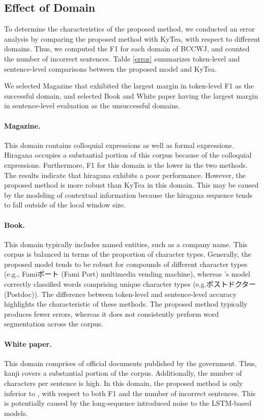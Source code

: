 \documentclass[11pt]{article}
\begin{document}
\subsection{Effect of Domain}
To determine the characteristics of the proposed method, we conducted
an error analysis by comparing the proposed method with KyTea, with respect to
different domains. Thus, we computed the F1 for each domain of BCCWJ, and
counted the number of incorrect sentences. Table \ref{error} summarizes
token-level and sentence-level comparisons between the proposed model and KyTea.

We selected Magazine that exhibited the largest margin in token-level F1 as
the successful domain, and selected Book and White paper having the largest
margin in sentence-level evaluation as the unsuccessful domains.

\paragraph{Magazine.} This domain contains colloquial expressions as well as
formal expressions. Hiragana occupies a substantial portion of this corpus
because of the colloquial expressions. Furthermore, F1 for this domain is the
lower in the two methods.
The results indicate that hiragana exhibits a poor performance. However, the
proposed method is more robust than KyTea in this domain. This may be caused
by the modeling of contextual information because the hiragana sequence tends
to fall outside of the local window size.

\paragraph{Book.}  This domain typically includes named entities, such as
a company name. This corpus is balanced in terms of the proportion of
character types.
Generally, the proposed model tends to be robust for compounds of different
character types (e.g., Famiポート (Fami Port)
multimedia vending machine), whereas
's model correctly classified
words comprising unique character types (e.g.ポストドクター (Postdoc)).
The difference between token-level and sentence-level accuracy
highlights the characteristic of these methods. The proposed method typically
produces fewer errors, whereas it does not consistently perform word
segmentation across the corpus.

\paragraph{White paper.} This domain comprises of official documents published
by the government. Thus, kanji covers a substantial portion of the corpus.
Additionally, the number of characters per sentence is high. In this domain,
the proposed method is only inferior to
, with respect to both F1 and the
number of incorrect sentences. This is potentially caused by the long-sequence
introduced noise to the LSTM-based models.
\end{document}
